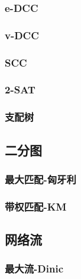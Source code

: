 \documentclass[twocolumn,a4]{article}
\newcommand{\addcpp}[1]{}
\begin{document}
		\subsubsection{e-DCC}
		\subsubsection{v-DCC}
		\subsubsection{SCC}
			\addcpp{graph/SCC}
		\subsubsection{2-SAT}
			\addcpp{graph/2-SAT}
		\subsubsection{支配树}
	\subsection{二分图}
		\subsubsection{最大匹配-匈牙利}		
			\addcpp{graph/hungary}
		\subsubsection{带权匹配-KM} %
			\addcpp{graph/KM}
	\subsection{网络流}
		\subsubsection{最大流-Dinic}
			\addcpp{graph/MF_dinic}
\end{document}
